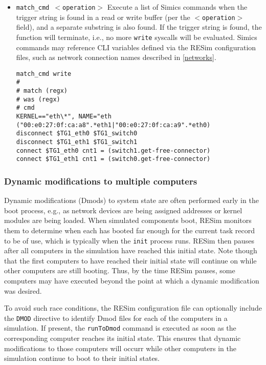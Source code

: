 \documentclass[titlepage]{article}
\begin{document}
\begin{itemize}
\item {\tt match\_cmd $<$operation$>$} Execute a list of Simics commands when the trigger string is found
in a read or write buffer (per the {\tt $<$operation$>$} field), and a separate substring is also found.  If the trigger string is
found, the function will terminate, i.e., no more {\tt write} syscalls will be evaluated.  Simics commands may reference
CLI variables defined via the RESim configuration files, such as network connection names described in \ref{networks}.
\begin{verbatim}
match_cmd write
#
# match (regx)
# was (regx)
# cmd
KERNEL=="eth\*", NAME="eth
("00:e0:27:0f:ca:a8".*eth1|"00:e0:27:0f:ca:a9".*eth0)
disconnect $TG1_eth0 $TG1_switch0
disconnect $TG1_eth1 $TG1_switch1
connect $TG1_eth0 cnt1 = (switch1.get-free-connector)
connect $TG1_eth1 cnt1 = (switch0.get-free-connector)
\end{verbatim}
\end{itemize}

\subsubsection{Dynamic modifications to multiple computers}
Dynamic modifications (Dmods) to system state are often performed early in the boot process, e.g.,
as network devices are being assigned addresses or kernel modules are being loaded.
When simulated components boot, RESim monitors them to determine when each has booted far enough
for the current task record to be of use, which is typically when the {\tt init} process runs.
RESim then pauses after all computers in the simulation have reached this initial state.  Note though that
the first computers to have reached their initial state will continue on while other computers are still
booting.  Thus, by the time RESim pauses, some computers may have executed beyond the point
at which a dynamic modification was desired.

To avoid such race conditions, the RESim configuration file can optionally include the {\tt DMOD} directive
to identify Dmod files for each of the computers in a simulation.  If present, the {\tt runToDmod} command is executed
as soon as the corresponding computer reaches its initial state.  This ensures that dynamic modifications
to those computers will occurr while other computers in the simulation continue to boot to their 
initial states.
\end{document}
